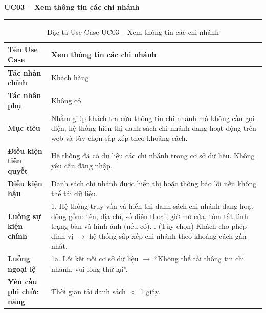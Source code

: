 ﻿\documentclass[../DoAn.tex]{subfiles}
\newcommand{\UCtitle}[1]{%
    \vspace{0.5em}
    {\large\bfseries #1}\\[-0.5em]
    \rule{\textwidth}{0.5pt}
    \vspace{0.3em}
}
\begin{document}
\begin{table}[H]
\UCtitle{UC03 – Xem thông tin các chi nhánh}
\centering
\begin{tabular}{|p{4cm}|p{10cm}|}
\hline
\textbf{Tên Use Case} & Xem thông tin các chi nhánh \\ \hline
\textbf{Tác nhân chính} & Khách hàng \\ \hline
\textbf{Tác nhân phụ} & Không có \\ \hline
\textbf{Mục tiêu} &
Nhằm giúp khách tra cứu thông tin chi nhánh mà không cần gọi điện, hệ thống hiển thị danh sách chi nhánh đang hoạt động trên web và tùy chọn sắp xếp theo khoảng cách.
\\ \hline
\textbf{Điều kiện tiên quyết} &
Hệ thống đã có dữ liệu các chi nhánh trong cơ sở dữ liệu. Không yêu cầu đăng nhập.
\\ \hline
\textbf{Điều kiện hậu} &
Danh sách chi nhánh được hiển thị hoặc thông báo lỗi nếu không thể tải dữ liệu.
\\ \hline
\textbf{Luồng sự kiện chính} &
1. Hệ thống truy vấn và hiển thị danh sách chi nhánh đang hoạt động gồm: tên, địa chỉ, số điện thoại, giờ mở cửa, tóm tắt tình trạng bàn và hình ảnh (nếu có). \newline
2. (Tùy chọn) Khách cho phép định vị $\rightarrow$ hệ thống sắp xếp chi nhánh theo khoảng cách gần nhất.
\\ \hline
\textbf{Luồng ngoại lệ} &
1a. Lỗi kết nối cơ sở dữ liệu $\rightarrow$ ``Không thể tải thông tin chi nhánh, vui lòng thử lại''.
\\ \hline
\textbf{Yêu cầu phi chức năng} &
Thời gian tải danh sách $<$ 1 giây.
\\ \hline
\end{tabular}
\caption{Đặc tả Use Case UC03 – Xem thông tin các chi nhánh}
\end{table}
\end{document}
